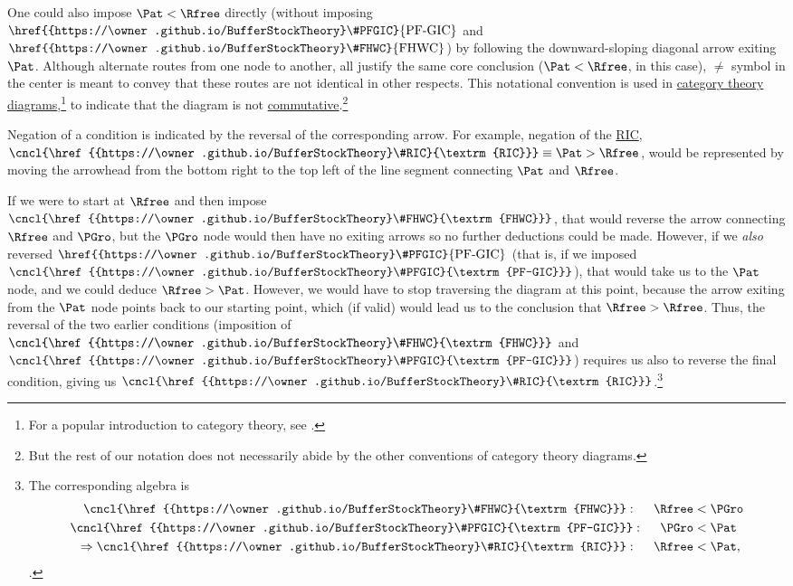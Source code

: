 \documentclass[\econtexRoot/BufferStockTheory]{subfiles}
\newcommand{\BSTlinkTo}{https://\owner.github.io/BufferStockTheory}
\renewcommand{\FHWC}{\href{{\BSTlinkTo}FHWC}{\textrm{FHWC}}}
\renewcommand{\FHWC}{\href{{\BSTlinkTo}\#FHWC}{\textrm{FHWC}}}
\renewcommand{\PFGIC}{\href{{\BSTlinkTo}\#PFGIC}{\textrm{PF-GIC}}}
\renewcommand{\RIC}{\href{{\BSTlinkTo}\#RIC}{\textrm{RIC}}}
\begin{document}
One could also impose $\Pat < \Rfree$ directly (without imposing $\PFGIC$ and $\FHWC$) by following the downward-sloping diagonal arrow exiting $\Pat$.  Although alternate routes from one node to another, all justify the same core conclusion ($\Pat < \Rfree$, in this case), $\neq$ symbol in the center is meant to convey that these routes are not identical in other respects.  This notational convention is used in \href{https://en.wikipedia.org/wiki/Diagram_(category_theory)}{category theory diagrams},\footnote{For a popular introduction to category theory, see \cite{riehl2017category}.} to indicate that the diagram is not \href{https://en.wikipedia.org/wiki/Commutative_diagram}{commutative}.\footnote{But the rest of our notation does not necessarily abide by the other conventions of category theory diagrams.}

Negation of a condition is indicated by the reversal of the corresponding arrow.  For example, negation of the {\RIC},  $\cncl{\RIC} \equiv \Pat > \Rfree$, would be represented by moving the arrowhead from the bottom right to the top left of the line segment connecting {$\Pat$} and $\Rfree$.

If we were to start at $\Rfree$ and then impose $\cncl{\FHWC}$, that would reverse the arrow connecting $\Rfree$ and $\PGro$, but the $\PGro$ node would then have no exiting arrows so no further deductions could be made.  However, if we \textit{also} reversed $\PFGIC$ (that is, if we imposed $\cncl{\PFGIC}$), that would take us to the $\Pat$ node, and we could deduce $\Rfree > \Pat$.  However, we would have to stop traversing the diagram at this point, because the arrow exiting from the $\Pat$ node points back to our starting point, which (if valid) would lead us to the conclusion that $\Rfree > \Rfree$.  Thus, the reversal of the two earlier conditions (imposition of $\cncl{\FHWC}$ and $\cncl{\PFGIC}$) requires us also to reverse the final condition, giving us $\cncl{\RIC}$.\footnote{The corresponding algebra is
\begin{equation}\begin{gathered}\begin{aligned}
  \cncl{\FHWC}:~~~~  \Rfree & < \PGro    
  \\ \cncl{\PFGIC}:~~~~ \PGro & < \Pat %
                                \label{eq:cnclRIC}
  \\ \Rightarrow \cncl{\RIC}:~~~~\Rfree & < \Pat  ,
\end{aligned}\end{gathered}\end{equation}.}
\end{document}
